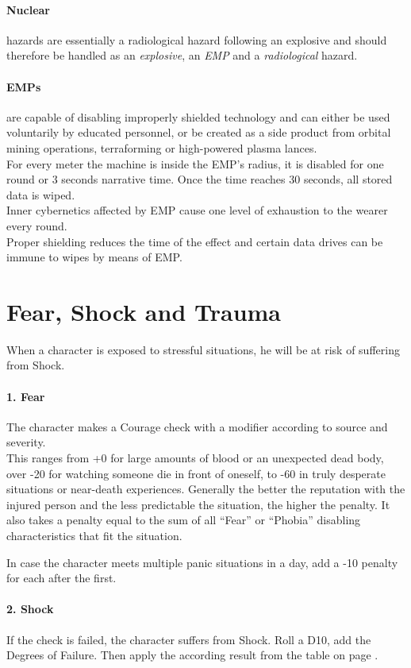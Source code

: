 \documentclass[12pt,a4paper,openany,dvipsnames]{book}
\begin{document}
	\paragraph{Nuclear} hazards are essentially a radiological hazard following an explosive and should therefore be handled as an \emph{explosive}, an \emph{EMP} and a \emph{radiological} hazard.
	\paragraph{EMPs} are capable of disabling improperly shielded technology and can either be used voluntarily by educated personnel, or be created as a side product from orbital mining operations, terraforming or high-powered plasma lances.\\
	For every meter the machine is inside the EMP’s radius, it is disabled for one round or 3 seconds narrative time. Once the time reaches 30 seconds, all stored data is wiped.\\
	Inner cybernetics affected by EMP cause one level of exhaustion to the wearer every round.\\
	Proper shielding reduces the time of the effect and certain data drives can be immune to wipes by means of EMP.
%
	\section{Fear, Shock and Trauma}
	\label{sec:fear}
	When a character is exposed to stressful situations, he will be at risk of suffering from Shock.
	\\%
	\paragraph{1. Fear}
	The character makes a Courage check with a modifier according to source and severity.\\
	This ranges from +0 for large amounts of blood or an unexpected dead body, over -20 for watching someone die in front of oneself, to -60 in truly desperate situations or near-death experiences.
	Generally the better the reputation with the injured person and the less predictable the situation, the higher the penalty. It also takes a penalty equal to the sum of all “Fear” or “Phobia” disabling characteristics that fit the situation.
	\par \vspace{-5mm}
	In case the character meets multiple panic situations in a day, add a -10 penalty for each after the first.
	\paragraph{2. Shock}
	If the check is failed, the character suffers from Shock.
	Roll a D10, add the Degrees of Failure.
	Then apply the according result from the table on page \pageref{feartable}.
\end{document}
